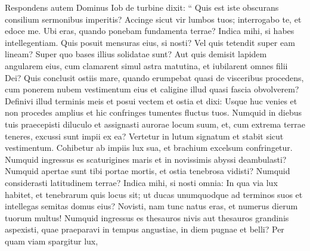 \begin{biblechapter}
\begin{biblechapter}
\begin{biblechapter}
\begin{biblechapter}
\begin{biblechapter}
\begin{biblechapter}
\begin{biblechapter}
\begin{biblechapter}
\begin{biblechapter}
\begin{biblechapter}
\begin{biblechapter}
\begin{biblechapter}
\begin{biblechapter}
\begin{biblechapter}
\begin{biblechapter}
\begin{biblechapter}
\begin{biblechapter}
\begin{biblechapter}
\begin{biblechapter}
\begin{biblechapter}
\begin{biblechapter}
\begin{biblechapter}
\begin{biblechapter}
\begin{biblechapter}
\begin{biblechapter}
\begin{biblechapter}
\begin{biblechapter}
\begin{biblechapter}
\begin{biblechapter}
\begin{biblechapter}
\begin{biblechapter}
\begin{biblechapter}
\begin{biblechapter}
\begin{biblechapter}
\begin{biblechapter}
\begin{biblechapter}
\begin{biblechapter}
\begin{biblechapter}
\verse Respondens autem Dominus Iob de turbine dixit:
 \verse “ Quis est iste obscurans consilium
 sermonibus imperitis?
 \verse Accinge sicut vir lumbos tuos;
 interrogabo te, et edoce me.
 \verse Ubi eras, quando ponebam fundamenta terrae?
 Indica mihi, si habes intellegentiam.
 \verse Quis posuit mensuras eius, si nosti?
 Vel quis tetendit super eam lineam?
 \verse Super quo bases illius solidatae sunt?
 Aut quis demisit lapidem angularem eius,
 \verse cum clamarent simul astra matutina,
 et iubilarent omnes filii Dei?
 \verse Quis conclusit ostiis mare,
 quando erumpebat quasi de visceribus procedens,
 \verse cum ponerem nubem vestimentum eius
 et caligine illud quasi fascia obvolverem?
 \verse Definivi illud terminis meis
 et posui vectem et ostia
 \verse et dixi: Usque huc venies et non procedes amplius
 et hic confringes tumentes fluctus tuos.
 \verse Numquid in diebus tuis praecepisti diluculo
 et assignasti aurorae locum suum,
 \verse et, cum extrema terrae teneres,
 excussi sunt impii ex ea?
 \verse Vertetur in lutum signatum
 et stabit sicut vestimentum.
 \verse Cohibetur ab impiis lux sua,
 et brachium excelsum confringetur. 
\verse Numquid ingressus es scaturigines maris
 et in novissimis abyssi deambulasti?
 \verse Numquid apertae sunt tibi portae mortis,
 et ostia tenebrosa vidisti?
 \verse Numquid considerasti latitudinem terrae?
 Indica mihi, si nosti omnia:
 \verse In qua via lux habitet,
 et tenebrarum quis locus sit;
 \verse ut ducas unumquodque ad terminos suos
 et intellegas semitas domus eius?
 \verse Novisti, nam tunc natus eras,
 et numerus dierum tuorum multus!
 \verse Numquid ingressus es thesauros nivis
 aut thesauros grandinis aspexisti,
 \verse quae praeparavi in tempus angustiae,
 in diem pugnae et belli?
 \verse Per quam viam spargitur lux,

\end{biblechapter}
\end{biblechapter}
\end{biblechapter}
\end{biblechapter}
\end{biblechapter}
\end{biblechapter}
\end{biblechapter}
\end{biblechapter}
\end{biblechapter}
\end{biblechapter}
\end{biblechapter}
\end{biblechapter}
\end{biblechapter}
\end{biblechapter}
\end{biblechapter}
\end{biblechapter}
\end{biblechapter}
\end{biblechapter}
\end{biblechapter}
\end{biblechapter}
\end{biblechapter}
\end{biblechapter}
\end{biblechapter}
\end{biblechapter}
\end{biblechapter}
\end{biblechapter}
\end{biblechapter}
\end{biblechapter}
\end{biblechapter}
\end{biblechapter}
\end{biblechapter}
\end{biblechapter}
\end{biblechapter}
\end{biblechapter}
\end{biblechapter}
\end{biblechapter}
\end{biblechapter}
\end{biblechapter}
